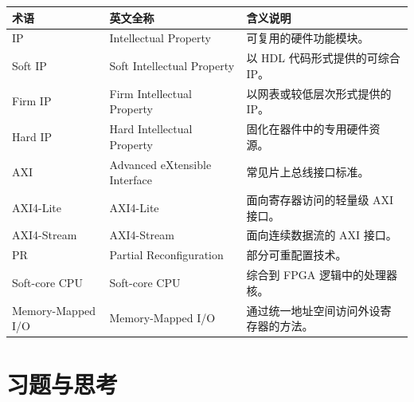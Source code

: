 \begin{longtable}[]{@{}
  >{\raggedright\arraybackslash}p{}
  >{\raggedright\arraybackslash}p{}
  >{\raggedright\arraybackslash}p{}@{}}
\toprule\noalign{}
\begin{minipage}[b]{\linewidth}\raggedright
术语
\end{minipage} & \begin{minipage}[b]{\linewidth}\raggedright
英文全称
\end{minipage} & \begin{minipage}[b]{\linewidth}\raggedright
含义说明
\end{minipage} \\
\midrule\noalign{}
\endhead
\bottomrule\noalign{}
\endlastfoot
IP & Intellectual Property & 可复用的硬件功能模块。 \\
Soft IP & Soft Intellectual Property & 以 HDL 代码形式提供的可综合
IP。 \\
Firm IP & Firm Intellectual Property & 以网表或较低层次形式提供的
IP。 \\
Hard IP & Hard Intellectual Property & 固化在器件中的专用硬件资源。 \\
AXI & Advanced eXtensible Interface & 常见片上总线接口标准。 \\
AXI4-Lite & AXI4-Lite & 面向寄存器访问的轻量级 AXI 接口。 \\
AXI4-Stream & AXI4-Stream & 面向连续数据流的 AXI 接口。 \\
PR & Partial Reconfiguration & 部分可重配置技术。 \\
Soft-core CPU & Soft-core CPU & 综合到 FPGA 逻辑中的处理器核。 \\
Memory-Mapped I/O & Memory-Mapped I/O &
通过统一地址空间访问外设寄存器的方法。 \\
\end{longtable}

\section{习题与思考}\label{ux4e60ux9898ux4e0eux601dux8003}

